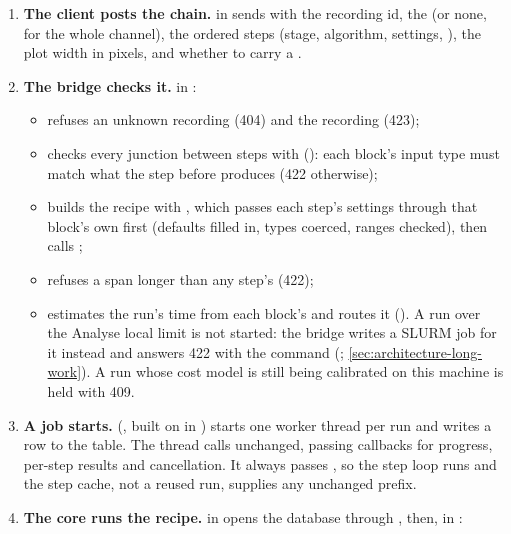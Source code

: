 \begin{enumerate}
\item \textbf{The client posts the chain.}  in  sends
   with the recording id, the  (or none, for the whole
  channel), the ordered steps (stage, algorithm, settings, ), the
  plot width in pixels, and whether to carry a .
\item \textbf{The bridge checks it.}  in :
  \begin{itemize}
  \item refuses an unknown recording (404) and the  recording (423);
  \item checks every junction between steps with 
    (): each block's input type must match what the step before
    produces (422 otherwise);
  \item builds the recipe with , which passes each step's settings through
    that block's own  first (defaults filled in, types coerced, ranges checked),
    then calls ;
  \item refuses a span longer than any step's  (422);
  \item estimates the run's time from each block's  and routes it
    (). A run over the Analyse local limit is not started: the bridge writes
    a SLURM job for it instead and answers 422 with the  command
    (; \cref{sec:architecture-long-work}). A run whose cost model is still
    being calibrated on this machine is held with 409.
  \end{itemize}
\item \textbf{A job starts.}  (, built on
   in ) starts one worker thread per run and writes a
  row to the  table. The thread calls  unchanged, passing callbacks
  for progress, per-step results and cancellation. It always passes , so the step
  loop runs and the step cache, not a reused run, supplies any unchanged prefix.
\item \textbf{The core runs the recipe.}  in 
  opens the database through , then, in :

\end{enumerate}
